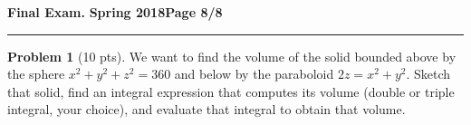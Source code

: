 \documentclass[12pt]{article}
\theoremstyle{definition}
\newtheorem{problem}{Problem}
\begin{document}
\hfill{\large\bf Final Exam.}\hfill{\large\bf
  Spring 2018}\hfill{\large\bf Page 8/8}\hrule

\bigskip
\begin{problem}[10 pts]
We want to find the volume of the solid bounded above by the sphere $x^2+y^2+z^2=360$ and below by the paraboloid $2z = x^2+y^2$. Sketch that solid, find an integral expression that computes its volume (double or triple integral, your choice), and evaluate that integral to obtain that volume.
\vspace{19cm}
\begin{flushright}
\end{flushright}
\end{problem}
\end{document}
